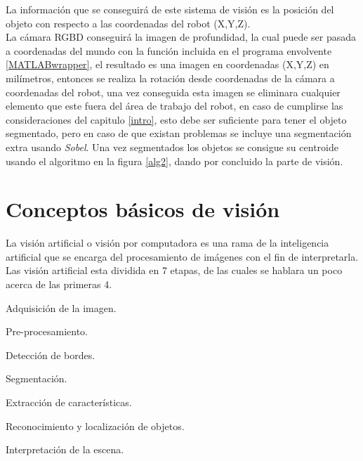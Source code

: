     La información que se conseguirá de este sistema de visión es la posición del objeto con respecto a las coordenadas del robot (X,Y,Z).\\
    La cámara RGBD conseguirá la imagen de profundidad, la cual puede ser pasada a coordenadas del mundo con la función incluida en el programa envolvente \cref{MATLABwrapper}, el resultado es una imagen en coordenadas (X,Y,Z) en milímetros, entonces se realiza la rotación desde coordenadas de la cámara a coordenadas del robot, una vez conseguida esta imagen se eliminara cualquier elemento que este fuera del área de trabajo del robot, en caso de cumplirse las consideraciones del  capitulo \ref{intro}, esto debe ser suficiente para tener el objeto segmentado, pero en caso de que existan problemas se incluye una segmentación extra usando \textit{Sobel}.
    Una vez segmentados los objetos se consigue su centroide usando el algoritmo en la figura \ref{alg2}, dando por concluido la parte de visión.
    
    
    \section{Conceptos básicos de visión}
    
    La visión artificial o visión por computadora es una rama de la inteligencia artificial que se encarga del procesamiento de imágenes con el fin de interpretarla.
    Las visión artificial esta dividida en 7 etapas, de las cuales se hablara un poco acerca de las primeras 4.
    
    \begin{prop}
    	\item  Adquisición de la imagen. \label{viseta:1}
    	\item  Pre-procesamiento. \label{viseta:2}
    	\item  Detección de bordes. \label{viseta:3}
    	\item  Segmentación. \label{viseta:4}
    	\item  Extracción de características. \label{viseta:5}
    	\item  Reconocimiento y localización de objetos. \label{viseta:6}
    	\item  Interpretación de la escena. \label{viseta:7}
    \end{prop} 
    
